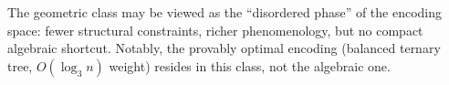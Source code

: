 The geometric class may be viewed as the ``disordered phase'' of the
encoding space: fewer structural constraints, richer phenomenology,
but no compact algebraic shortcut.  Notably, the provably optimal
encoding (balanced ternary tree, $O(\log_3 n)$ weight) resides in
this class, not the algebraic one.

